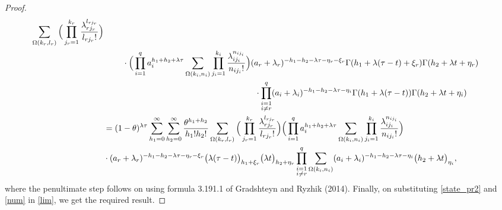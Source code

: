 \documentclass[12pt,oneside,reqno]{amsart}
\numberwithin{equation}{section}
\theoremstyle{definition}
\numberwithin{equation}{section}
\theoremstyle{remarkstyle}
\begin{document}
\begin{proof}
{\begin{align*}
		\sum_{\Omega(k_r,l_r)}\Big(\prod_{j_r=1}^{k_r}\frac{\lambda_{rj_r}^{l_{rj_r}}}{l_{rj_r}!}\Big)\nonumber\\
		&\hspace{.8cm}\cdot\Big(\prod_{i=1}^{q}a_i^{h_1+h_2+\lambda\tau}\sum_{\Omega(k_i,n_i)}\prod_{j_i=1}^{k_i}\frac{\lambda_{ij_i}^{n_{ij_i}}}{n_{ij_i}!}\Big)
		(a_r+\lambda_r)^{-h_1-h_2-\lambda\tau-\eta_r-\xi_r}\Gamma(h_1+\lambda(\tau-t)+\xi_r)\Gamma(h_2+\lambda t+\eta_r)\nonumber\\
		&\hspace{6.4cm}\cdot\prod_{\substack{i=1\\i\neq r}}^{q}(a_i+\lambda_i)^{-h_1-h_2-\lambda\tau-\eta_i}\Gamma(h_1+\lambda(\tau-t))\Gamma(h_2+\lambda t+\eta_i)\nonumber\\
		&=(1-\theta)^{\lambda \tau}\sum_{h_1=0}^{\infty}\sum_{h_2=0}^{\infty}
		\frac{\theta^{h_1+h_2}}{h_1!h_2!}\sum_{\Omega(k_r,l_r)}\Big(\prod_{j_r=1}^{k_r}\frac{\lambda_{rj_r}^{l_{rj_r}}}{l_{rj_r}!}\Big)
		\Big(\prod_{i=1}^{q}a_i^{h_1+h_2+\lambda\tau}\sum_{\Omega(k_i,n_i)}\prod_{j_i=1}^{k_i}\frac{\lambda_{ij_i}^{n_{ij_i}}}{n_{ij_i}!}\Big)\nonumber\\ &\cdot(a_r+\lambda_r)^{-h_1-h_2-\lambda\tau-\eta_r-\xi_r}\big(\lambda(\tau-t)\big)_{h_1+\xi_r}\big(\lambda t\big)_{h_2+\eta_r}
		\prod_{\substack{i=1\\i\neq r}}^{q}\sum_{\Omega(k_i,n_i)}(a_i+\lambda_i)^{-h_1-h_2-\lambda\tau-\eta_i}\big(h_2+\lambda t\big)_{\eta_i},\label{num}
	\end{align*}}
	where the penultimate step follows on using formula 3.191.1 of Gradshteyn and Ryzhik (2014). Finally, on substituting \eqref{state_pr2} and \eqref{num} in \eqref{lim}, we get the required result.
\end{proof}
\end{document}
